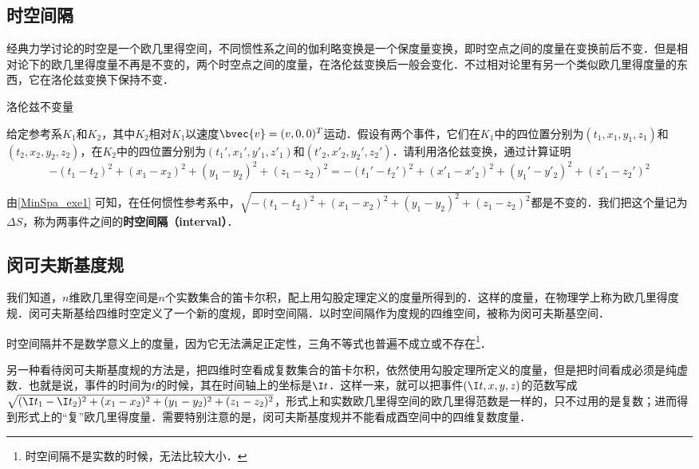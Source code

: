 

\subsection{时空间隔}
经典力学讨论的时空是一个欧几里得空间，不同惯性系之间的伽利略变换是一个保度量变换，即时空点之间的度量在变换前后不变．但是相对论下的欧几里得度量不再是不变的，两个时空点之间的度量，在洛伦兹变换后一般会变化．不过相对论里有另一个类似欧几里得度量的东西，它在洛伦兹变换下保持不变．

\begin{exercise}{洛伦兹不变量}\label{MinSpa_exe1}

给定参考系$K_1$和$K_2$，其中$K_2$相对$K_1$以速度$\bvec{v}=(v,0,0)^T$运动．假设有两个事件，它们在$K_1$中的四位置分别为$(t_1, x_1, y_1, z_1)$和$(t_2, x_2, y_2, z_2)$，在$K_2$中的四位置分别为$(t_1', x_1', y'_1, z'_1)$和$(t'_2, x'_2, y_2', z_2')$．请利用洛伦兹变换，通过计算证明
\begin{equation}
-(t_1-t_2)^2+(x_1-x_2)^2+(y_1-y_2)^2+(z_1-z_2)^2=-(t_1'-t_2')^2+(x'_1-x'_2)^2+(y_1'-y'_2)^2+(z'_1-z_2')^2
\end{equation}
\end{exercise}

由\autoref{MinSpa_exe1} 可知，在任何惯性参考系中，$\sqrt{-(t_1-t_2)^2+(x_1-x_2)^2+(y_1-y_2)^2+(z_1-z_2)^2}$都是不变的．我们把这个量记为$\Delta S$，称为两事件之间的\textbf{时空间隔（interval）}．

\subsection{闵可夫斯基度规}

我们知道，$n$维欧几里得空间是$n$个实数集合的笛卡尔积，配上用勾股定理定义的度量所得到的．这样的度量，在物理学上称为欧几里得度规．闵可夫斯基给四维时空定义了一个新的度规，即时空间隔．以时空间隔作为度规的四维空间，被称为闵可夫斯基空间．

时空间隔并不是数学意义上的度量，因为它无法满足正定性，三角不等式也普遍不成立或不存在\footnote{时空间隔不是实数的时候，无法比较大小．}．

另一种看待闵可夫斯基度规的方法是，把四维时空看成复数集合的笛卡尔积，依然使用勾股定理所定义的度量，但是把时间看成必须是纯虚数．也就是说，事件的时间为$t$的时候，其在时间轴上的坐标是$\I t$．这样一来，就可以把事件$(\I t, x, y, z)$的范数写成$\sqrt{(\I t_1-\I t_2)^2+(x_1-x_2)^2+(y_1-y_2)^2+(z_1-z_2)^2}$，形式上和实数欧几里得空间的欧几里得范数是一样的，只不过用的是复数；进而得到形式上的“复”欧几里得度量．需要特别注意的是，闵可夫斯基度规并不能看成酉空间中的四维复数度量．

